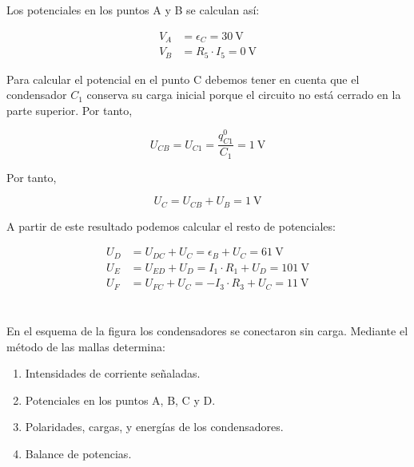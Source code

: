\documentclass[10pt]{article}
\begin{document}
Los potenciales en los puntos A y B se calculan así:

\begin{align*}
  V_A &= \epsilon_C = \SI{30}{\volt}\\
  V_B &= R_5 \cdot I_5 = \SI{0}{\volt}
\end{align*}

Para calcular el potencial en el punto C debemos tener en cuenta que el condensador $C_1$ conserva su carga inicial porque el circuito no está cerrado en la parte superior. Por tanto,

\begin{equation*}
  U_{CB} = U_{C1} = \frac{q^0_{C1} }{C_1} = \SI{1}{\volt}
\end{equation*}

Por tanto,

\begin{equation*}
  U_C = U_{CB} + U_B = \SI{1}{\volt}
\end{equation*}

A partir de este resultado podemos calcular el resto de potenciales:

\begin{align*}
  U_D &= U_{DC} + U_C = \epsilon_B + U_C = \SI{61}{\volt}\\
  U_E &= U_{ED} + U_D = I_1 \cdot R_1 + U_D = \SI{101}{\volt}\\
  U_F &= U_{FC} + U_C = -I_3 \cdot R_3 + U_C = \SI{11}{\volt}
\end{align*}

\clearpage

\section{}

En el esquema de la figura los condensadores se conectaron sin
carga. Mediante el método de las mallas determina:
\begin{enumerate}
\item Intensidades de corriente señaladas.
\item Potenciales en los puntos A, B, C y D.
\item Polaridades, cargas, y energías de los condensadores.
\item Balance de potencias.
\end{enumerate}
\end{document}
